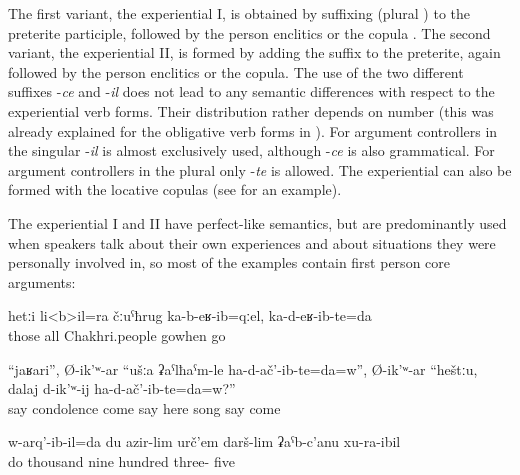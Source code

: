 The first variant, the experiential I, is obtained by suffixing  (plural ) to the preterite participle, followed by the person enclitics or the copula . The second variant, the experiential II, is formed by adding the suffix  to the preterite, again followed by the person enclitics or the copula. The use of the two different suffixes -\textit{ce} and -\textit{il} does not lead to any semantic differences with respect to the experiential verb forms. Their distribution rather depends on number (this was already explained for the obligative verb forms in ). For argument controllers in the singular -\textit{il} is almost exclusively used, although -\textit{ce} is also grammatical. For argument controllers in the plural only -\textit{te} is allowed. The experiential can also be formed with the locative copulas (see  for an example).

The experiential I and II have perfect-like semantics, but are predominantly used when speakers talk about their own experiences and about situations they were personally involved in, so most of the examples contain first person core arguments:
%
\begin{exe}
	\ex	\label{ex:‎When all Chakhri people moved to the lowlands, we (also) moved}
	\gll	hetːi	li<b>il=ra	čːuˁħrug	ka-b-eʁ-ib=qːel,	ka-d-eʁ-ib-te=da	\\
		those	all	Chakhri.people	gowhen	go\\
	\glt	{}

	\ex	\label{ex:Then Abdulkhalik says, have you come here for making condolence or for singing songs}
	\gll	``jaʁari'',	Ø-ik'ʷ-ar	``ušːa	ʡaˁlħaˁm-le	ha-d-ač'-ib-te=da=w'',	Ø-ik'ʷ-ar	``heštːu,		dalaj	d-ik'ʷ-ij	ha-d-ač'-ib-te=da=w?''\\
			say		condolence	come	say	here		song	say	come\\
	\glt	{}

	\ex	\label{ex:‎‎‎I was born in 1935 analytic}
	\gll	w-arq'-ib-il=da	du	azir-lim	urč'em	darš-lim	ʡaˁb-c'anu	xu-ra-ibil\\
		do		thousand	nine	hundred	three-	five\\
	\glt	{}
\end{exe}

